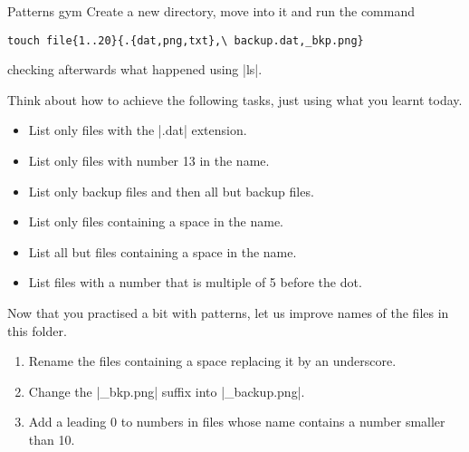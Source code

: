 
\begin{exercise}[Inspirational]{Patterns gym}
    Create a new directory, move into it and run the command
    \begin{lstlisting}[style=MyBash]
        touch file{1..20}{.{dat,png,txt},\ backup.dat,_bkp.png}
    \end{lstlisting}
    checking afterwards what happened using \bash|ls|.

    Think about how to achieve the following tasks, just using what you learnt today.
    \begin{itemize}
        \item List only files with the \bash|.dat| extension.
        \item List only files with number 13 in the name.
        \item List only backup files and then all but backup files.
        \item List only files containing a space in the name.
        \item List all but files containing a space in the name.
        \item List files with a number that is multiple of 5 before the dot.
    \end{itemize}

    Now that you practised a bit with patterns, let us improve names of the files in this folder.
    \begin{enumerate}
        \item Rename the files containing a space replacing it by an underscore.
        \item Change the \bash|_bkp.png| suffix into \bash|_backup.png|.
        \item Add a leading 0 to numbers in files whose name contains a number smaller than 10.
    \end{enumerate}


\end{exercise}
